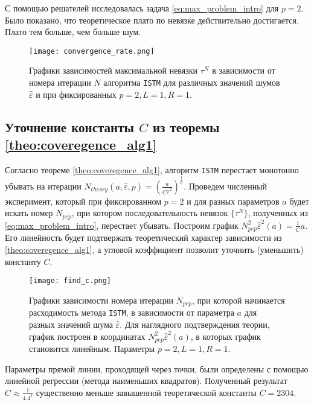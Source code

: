 \documentclass{article}
\begin{document}
С помощью решателей исследовалась задача \eqref{eq:max_problem_intro} для $p = 2$. Было показано, что теоретическое плато по невязке действительно достигается. Плато тем больше, чем больше шум.

\begin{figure}[htp]
\centering
{\texttt{[image: convergence\_rate.png]} }
\caption{Графики зависимостей максимальной невязки $\tau^N$ в зависимости от номера итерации $N$ алгоритма \texttt{ISTM} для различных значений шумов $\hat{\varepsilon}$ и при фиксированных $p = 2, L = 1, R = 1$. }
\label{fig:conv_with_opt_a_diff_p}
\end{figure}

\subsection{Уточнение константы $C$ из теоремы \ref{theo:coveregence_alg1}}

Согласно теореме \ref{theo:coveregence_alg1}, алгоритм \texttt{ISTM} перестает монотонно убывать на итерации $N_{theory} (a,\hat{\varepsilon}, p) = (\frac{a}{C \hat{\varepsilon}^2})^{\frac{1}{p}}$. Проведем численный эксперимент, который при фиксированном $p = 2$ и для разных параметров $a$ будет искать номер $N_{pep}$, при котором последовательность невязок $\{\tau^N\}$, полученных из \eqref{eq:max_problem_intro}, перестает убывать. Построим график $N_{pep}^2 \hat{\varepsilon}^2 (a) = \frac{1}{C} a$. Его линейность будет подтвержать теоретический характер зависимости из \ref{theo:coveregence_alg1}, а угловой коэффициент позволит уточнить (уменьшить) константу $C$.

\begin{figure}[htp]
\centering
{\texttt{[image: find\_c.png]} }
\caption{Графики зависимости номера итерации $N_{pep}$, при которой начинается расходимость метода \texttt{ISTM}, в зависимости от параметра $a$ для разных значений шума $\hat{\varepsilon}$. Для наглядного подтверждения теории, график построен в координатах $N_{pep}^2 \hat{\varepsilon}^2 (a)$, в которых график становится линейным. Параметры $p = 2, L = 1, R = 1$. }
\label{fig:conv_with_opt_a_diff_p}
\end{figure}

Параметры прямой линии, проходящей через точки, были определены с помощью линейной регрессии (метода наименьших квадратов). Полученный результат $C \approx \frac{1}{4.4^2}$ существенно меньше завышенной теоретической константы $C = 2304$.









\end{document}
